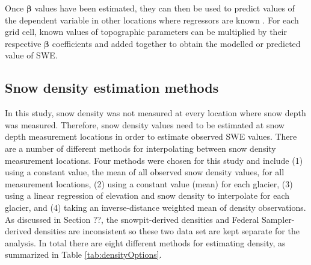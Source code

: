 \documentclass[12pt]{article}
\begin{document}
Once $\bm{\beta}$ values have been estimated, they can then be used to predict values of the dependent variable in other locations where regressors are known \citep{Davis1986}. For each grid cell, known values of topographic parameters can be multiplied by their respective $\bm{\beta}$ coefficients and added together to obtain the modelled or predicted value of SWE.

\subsection{Snow density estimation methods}

In this study, snow density was not measured at every location where snow depth was measured. Therefore, snow density values need to be estimated at snow depth measurement locations in order to estimate observed SWE values. There are a number of different methods for interpolating between snow density measurement locations. Four methods were chosen for this study and include (1) using a constant value, the mean of all observed snow density values, for all measurement locations, (2) using a constant value (mean) for each glacier, (3) using a linear regression of elevation and snow density to interpolate for each glacier, and (4) taking an inverse-distance weighted mean of density observations. As discussed in Section ??, the snowpit-derived densities and Federal Sampler-derived densities are inconsistent so these two data set are kept separate for the analysis. In total there are eight different methods for estimating density, as summarized in Table \ref{tab:densityOptions}.
\end{document}

